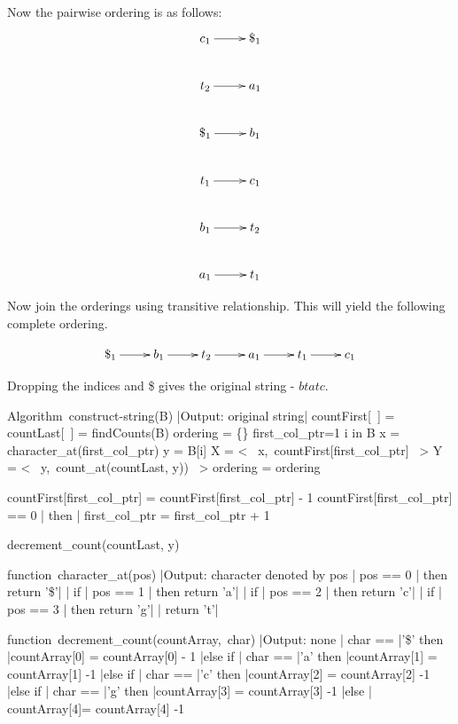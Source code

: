 \documentclass{article}
\begin{document}
Now the pairwise ordering is as follows:
\begin{displaymath}
  \xymatrix{ 
 c_{1}  \ar[r] & \$_{1} \\
 t_{2}  \ar[r] & a_{1} \\
 \$_{1} \ar[r] & b_{1}\\
 t_{1}  \ar[r] & c_{1} \\
 b_{1} \ar[r]  & t_{2} \\
a_{1}   \ar[r] & t_{1}  \\ }
\end{displaymath}

Now join the orderings using transitive relationship. This will yield the following complete ordering. 

\begin{displaymath}
  \xymatrix{ 
   \$_{1} \ar[r] & b_{1} \ar[r]  & t_{2} \ar[r] & a_{1} \ar[r] & t_{1} \ar[r] & c_{1} \\
 }
\end{displaymath}

Dropping the indices and \$ gives the original string - $btatc$.

\begin{program}
\mbox{Algorithm construct-string(B)}
|Output: original string|
\BEGIN
	countFirst[\ ] = countLast[\ ] = findCounts(B)
	ordering = \{\}
	first\_col\_ptr=1 
	\FOR i in B \DO
		x = character\_at(first\_col\_ptr)
		y = B[i]
		X = < \ x,\ countFirst[first\_col\_ptr] \ >
		Y = < \ y,\ count\_at(countLast, y)) \ >
		ordering = ordering 
		
		countFirst[first\_col\_ptr] = countFirst[first\_col\_ptr] - 1
		\IF countFirst[first\_col\_ptr] == 0 | then |
			first\_col\_ptr = first\_col\_ptr + 1
		\FI

		decrement\_count(countLast, y)
	\OD
	
\END
\end{program}

\begin{program}
\mbox{function character\_at(pos)}
|Output: character denoted by pos |
\BEGIN
	\IF pos == 0 | then return '\$'|
	\ELSE | if | pos == 1 | then return 'a'|
	\ELSE | if | pos == 2 | then return  'c'|
	\ELSE | if | pos == 3 | then return  'g'|
	\ELSE |  return  't'|
	\FI
\END
\end{program}


\begin{program}
\mbox{function decrement\_count(countArray, char)}
|Output: none |
\BEGIN
	\IF char == |'\$' then |countArray[0] = countArray[0] - 1 
	|else if | char == |'a' then |countArray[1] = countArray[1] -1 
	|else if | char == |'c' then |countArray[2] = countArray[2] -1 
	|else if | char == |'g' then |countArray[3] = countArray[3] -1
	|else | countArray[4]= countArray[4] -1 
	\FI
\END
\end{program}
\end{document}
